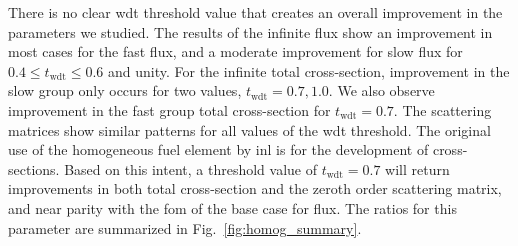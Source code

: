 There is no clear \gls{wdt} threshold value that creates an overall
improvement in the parameters we studied. The results of the infinite
flux show an improvement in most cases for the fast flux, and a
moderate improvement for slow flux for $0.4 \leq t_{\mathrm{wdt}} \leq
0.6$ and unity. For the infinite total cross-section, improvement in
the slow group only occurs for two values, $t_{\mathrm{wdt}} = 0.7,
1.0$. We also observe improvement in the fast group total
cross-section for $t_{\mathrm{wdt}} = 0.7$. The scattering matrices
show similar patterns for all values of the \gls{wdt} threshold. The
original use of the homogeneous fuel element by \gls{inl} is for the
development of cross-sections. Based on this intent, a threshold value
of $t_{\mathrm{wdt}} = 0.7$ will return improvements in both total
cross-section and the zeroth order scattering matrix, and near parity
with the \gls{fom} of the base case for flux. The ratios for this
parameter are summarized in Fig.~\ref{fig:homog_summary}.

